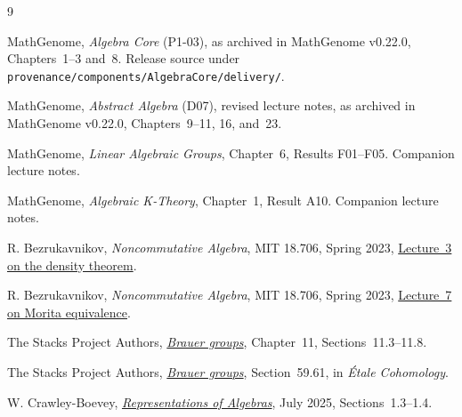 \documentclass[11pt,oneside,openany]{book}
\theoremstyle{definition}
\theoremstyle{remark}
\begin{document}
\backmatter
\begin{thebibliography}{9}

MathGenome, \emph{Algebra Core} (P1-03), as archived in MathGenome
v0.22.0, Chapters~1--3 and~8. Release source under
\texttt{provenance/components/AlgebraCore/delivery/}.

MathGenome, \emph{Abstract Algebra} (D07), revised lecture notes,
as archived in MathGenome v0.22.0, Chapters~9--11, 16, and~23.

MathGenome, \emph{Linear Algebraic Groups}, Chapter~6,
Results F01--F05. Companion lecture notes.

MathGenome, \emph{Algebraic K-Theory}, Chapter~1, Result A10.
Companion lecture notes.

R. Bezrukavnikov, \emph{Noncommutative Algebra}, MIT 18.706, Spring 2023,
\href{https://ocw.mit.edu/courses/18-706-noncommutative-algebra-spring-2023/resources/mit18_706_s23_lec03_pdf/}{Lecture~3 on the density theorem}.

R. Bezrukavnikov, \emph{Noncommutative Algebra}, MIT 18.706, Spring 2023,
\href{https://ocw.mit.edu/courses/18-706-noncommutative-algebra-spring-2023/resources/mit18_706_s23_lec07_pdf/}{Lecture~7 on Morita equivalence}.

The Stacks Project Authors,
\href{https://stacks.math.columbia.edu/tag/073W}{\emph{Brauer groups}},
Chapter~11, Sections~11.3--11.8.

The Stacks Project Authors,
\href{https://stacks.math.columbia.edu/tag/03R1}{\emph{Brauer groups}},
Section~59.61, in \emph{\'Etale Cohomology}.

W. Crawley-Boevey,
\href{https://www.math.uni-bielefeld.de/~wcrawley/25RA/Representations_of_Algebras_final_version_2025-07.pdf}{\emph{Representations of Algebras}},
July 2025, Sections~1.3--1.4.

\end{thebibliography}
\end{document}
